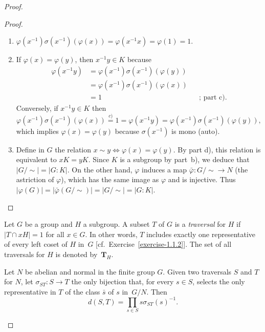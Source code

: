 \begin{solution}
\begin{proof}
\begin{proof}
\begin{enumerate}[\rm a)]
    \item $\varphi(x^{-1})\sigma(x^{-1})(\varphi(x))
        = \varphi(x^{-1}x)=\varphi(1)=1$.

    \item If $\varphi(x)=\varphi(y)$, then $x^{-1}y\in K$ because
        \begin{align*}
            \varphi(x^{-1}y) &= \varphi(x^{-1})\sigma(x^{-1})(\varphi(y))\\
                &= \varphi(x^{-1})\sigma(x^{-1})(\varphi(x))\\
                &= 1    &&\text{; part c)}.
        \end{align*}
        Conversely, if $x^{-1}y\in K$ then
        $$
            \varphi(x^{-1})\sigma(x^{-1})(\varphi(x)) \stackrel{c)}= 1
                = \varphi(x^{-1}y)
                = \varphi(x^{-1})\sigma(x^{-1})(\varphi(y)),
        $$
        which implies $\varphi(x)=\varphi(y)$ because $\sigma(x^{-1})$ is mono (auto).

    \item Define in $G$ the relation $x\sim y\iff\varphi(x)=\varphi(y)$. By part d), this relation is equivalent to $xK=yK$. Since $K$ is a subgroup by part~b), we deduce that $|G/{\sim}|=|G:K|$. On the other hand, $\varphi$ induces a map $\bar\varphi\colon G/{\sim}\to N$ (the astriction of $\varphi$), which has the same image as $\varphi$ and is injective. Thus $|\varphi(G)|=|\bar\varphi(G/{\sim})|=|G/{\sim}|=|G:K|$.
\end{enumerate}
\end{proof}

\begin{defn}
    Let\/ $G$ be a group and\/ $H$ a subgroup. A subset\/ $T$ of\/ $G$ is a \textsl{traversal} for\/ $H$ if\/ $|T\cap xH|=1$ for all\/ $x\in G$. In other words, $T$ includes exactly one representative of every left coset of\/ $H$ in\/~$G$ {\rm[cf.~Exercise~\ref{exercise-1.1.2}]}. The set of all traversals for\/ $H$ is denoted by\/~$\mathbf T_H$.
\end{defn}

\begin{ntn}\label{traversal-sigma}
    Let\/ $N$ be abelian and normal in the finite group\/ $G$. Given two traversals\/ $S$ and\/ $T$ for\/ $N$, let\/ $\sigma_{ST}\colon S\to T$ the only bijection that, for every\/ $s\in S$, selects the only representative in\/ $T$ of the class\/ $\bar s$ of $s$ in\/~$G/N$. Then
    $$
        d(S,T)=\prod_{s\in S}s\sigma_{ST}(s)^{-1}.
    $$
\end{ntn}


\end{proof}
\end{solution}
